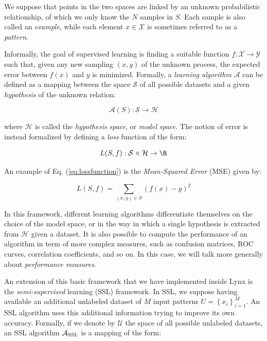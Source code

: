 We suppose that points in the two spaces are linked by an unknown probabilistic relationship, of which we only know the $N$ samples in $S$. Each sample is also called an \textit{example}, while each element $x \in \mathcal{X}$ is sometimes referred to as a \textit{pattern}.

Informally, the goal of supervised learning is finding a suitable function $f: \mathcal{X} \rightarrow \mathcal{Y}$ such that, given any new sampling $(x, y)$ of the unknown process, the expected error between $f(x)$ and $y$ is minimized. Formally, a \textit{learning algorithm} $\mathcal{A}$ can be defined as a mapping between the space $\mathcal{S}$ of all possible datasets and a given \textit{hypothesis} of the unknown relation:

\begin{equation}
\mathcal{A}(S) : \mathcal{S} \rightarrow \mathcal{H}
\label{eq:learningalgorithm}
\end{equation}

\noindent where $\mathcal{H}$ is called the \textit{hypothesis space}, or \textit{model space}. The notion of error is instead formalized by defining a \textit{loss} function of the form:

\begin{equation}
L(S, f) :  \mathcal{S} \times \mathcal{H} \rightarrow \R
\label{eq:lossfunction}
\end{equation}

\noindent An example of Eq. (\ref{eq:lossfunction}) is the \textit{Mean-Squared Error} (MSE) given by:

\[
L(S, f) = \sum_{(x,y) \in S}(f(x) - y)^2
\]

\noindent In this framework, different learning algorithms differentiate themselves on the choice of the model space, or in the way in which a single hypothesis is extracted from $\mathcal{H}$ given a dataset. It is also possible to compute the performance of an algorithm in term of more complex measures, such as confusion matrices, ROC curves, correlation coefficients, and so on. In this case, we will talk more generally about \textit{performance measures}.

An extension of this basic framework that we have implemented inside Lynx is the \textit{semi-supervised} learning (SSL) framework.\cite{chapelle2006semi} In SSL, we suppose having available an additional unlabeled dataset of $M$ input patterns $U = \left\{ x_i \right\}_{i=1}^M$. An SSL algorithm uses this additional information trying to improve its own accuracy. Formally, if we denote by $\mathcal{U}$ the space of all possible unlabeled datasets, an SSL algorithm $\mathcal{A}_{\mbox{\scriptsize SSL}}$ is a mapping of the form:

